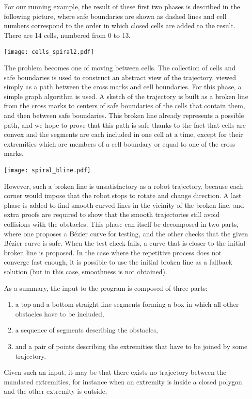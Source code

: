 \documentclass{llncs}
\begin{document}
For our running example, the result of these first two phases is
described in the following picture, where safe boundaries are shown as
dashed lines and cell numbers correspond to the order in which closed
cells are added to the result.  There are 14 cells, numbered from 0 to 13.
\begin{center}
\texttt{[image: cells\_spiral2.pdf]}
\end{center}
The problem becomes one of moving between cells. The collection of cells and
safe boundaries is used to
construct an abstract view of the trajectory, viewed simply as a path
between the cross marks and cell boundaries.  For this phase, a simple
graph algorithm is
used.  A sketch of the trajectory is built as a broken line from the
cross marks to centers of safe boundaries of the cells that contain
them, and then
between safe boundaries.  This broken line already represents a possible
path, and we hope to prove that this path is safe thanks to the fact
that cells are convex and the segments are each included in one
cell at a time, except for their extremities which are members of a cell
boundary or equal to one of the cross marks.
\begin{center}
\texttt{[image: spiral\_bline.pdf]}
\end{center}
However, such a broken line is unsatisfactory
as a robot trajectory, because each corner would impose that the robot
stops to rotate and change direction.  A last phase is added to find
smooth curved lines in the vicinity of the broken line, and extra proofs are
required to show that the smooth trajectories still avoid collisions with
the obstacles.  This phase can itself be decomposed in two parts, where one
proposes a Bézier curve for testing, and the other checks that the given
Bézier curve is safe.  When the test check fails, a curve that is closer
to the initial broken line is proposed.  In the case where the
repetitive process does not converge fast enough, it is possible to
use the initial broken line as
a fallback solution (but in this case, smoothness is not obtained).

As a summary, the input to the program is composed of three parts:
\begin{enumerate}
\item a top and a bottom straight line segments forming a box in
which all other obstacles have to be included,
\item a sequence of segments describing the obstacles,
\item and a pair of points describing the extremities that have to be
joined by some trajectory.
\end{enumerate}
Given such an input, it may be that there exists no trajectory between
the mandated extremities, for instance when an extremity is inside
a closed polygon and the other extremity is outside.
\end{document}
